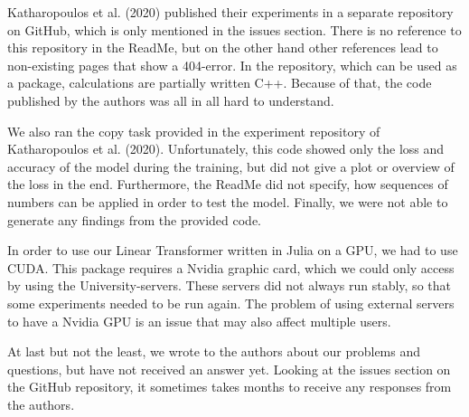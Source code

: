 \documentclass[DIV=13,fontsize=11pt]{scrartcl}
\begin{document}
Katharopoulos et al. (2020) published their experiments in a separate repository on GitHub, which is only mentioned in the issues section. There is no reference to this repository in the ReadMe, but on the other hand other references lead to non-existing pages that show a 404-error. In the repository, which can be used as a package, calculations are partially written C++. Because of that, the code published by the authors was all in all hard to understand. 

We also ran the copy task provided in the experiment repository of Katharopoulos et al. (2020). Unfortunately, this code showed only the loss and accuracy of the model during the training, but did not give a plot or overview of the loss in the end. Furthermore, the ReadMe did not specify, how sequences of numbers can be applied in order to test the model. Finally, we were not able to generate any findings from the provided code.

In order to use our Linear Transformer written in Julia on a GPU, we had to use CUDA. This package requires a Nvidia graphic card, which we could only access by using the University-servers. These servers did not always run stably, so that some experiments needed to be run again. The problem of using external servers to have a Nvidia GPU is an issue that may also affect multiple users.

At last but not the least, we wrote to the authors about our problems and questions, but have not received an answer yet. Looking at the issues section on the GitHub repository, it sometimes takes months to receive any responses from the authors.



\end{document}
